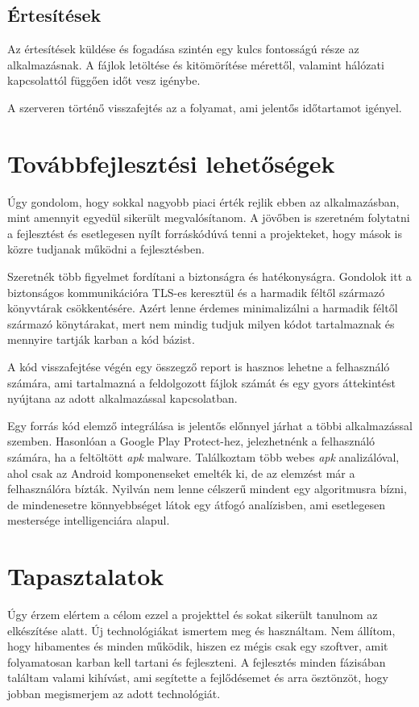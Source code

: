 \documentclass{thesis-ekf}
\theoremstyle{definition}
\theoremstyle{remark}
\begin{document}
\section{Értesítések}

Az értesítések küldése és fogadása szintén egy kulcs fontosságú része az alkalmazásnak.
A fájlok letöltése és kitömörítése mérettől, valamint hálózati kapcsolattól függően időt vesz igénybe.

A szerveren történő visszafejtés az a folyamat, ami jelentős időtartamot igényel.

\chapter{Továbbfejlesztési lehetőségek}\label{lehetosegek}

Úgy gondolom, hogy sokkal nagyobb piaci érték rejlik ebben az alkalmazásban, mint amennyit egyedül sikerült megvalósítanom.
A jövőben is szeretném folytatni a fejlesztést és esetlegesen nyílt forráskódúvá tenni a projekteket, hogy mások is közre tudjanak működni a fejlesztésben.

Szeretnék több figyelmet fordítani a biztonságra és hatékonyságra. 
Gondolok itt a biztonságos kommunikációra TLS-es keresztül és a harmadik féltől származó könyvtárak csökkentésére.
Azért lenne érdemes minimalizálni a harmadik féltől származó könytárakat, mert nem mindig tudjuk milyen kódot tartalmaznak és mennyire tartják karban a kód bázist.

A kód visszafejtése végén egy összegző report is hasznos lehetne a felhasználó számára, ami tartalmazná a feldolgozott fájlok számát és egy gyors áttekintést nyújtana az adott alkalmazással kapcsolatban.

Egy forrás kód elemző integrálása is jelentős előnnyel járhat a többi alkalmazással szemben. Hasonlóan a Google Play Protect-hez, jelezhetnénk a felhasználó számára, ha a feltöltött \emph{apk} malware.
Találkoztam több webes \emph{apk} analizálóval, ahol csak az Android komponenseket emelték ki, de az elemzést már a felhasználóra bízták.
Nyilván nem lenne célszerű mindent egy algoritmusra bízni, de mindenesetre könnyebbséget látok egy átfogó analízisben, ami esetlegesen mestersége intelligenciára alapul.

\chapter{Tapasztalatok}\label{tapasztalatok}

Úgy érzem elértem a célom ezzel a projekttel és sokat sikerült tanulnom az elkészítése alatt.
Új technológiákat ismertem meg és használtam. Nem állítom, hogy hibamentes és minden működik, hiszen ez mégis csak egy szoftver, amit folyamatosan karban kell tartani és fejleszteni.
A fejlesztés minden fázisában találtam valami kihívást, ami segítette a fejlődésemet és arra ösztönzöt, hogy jobban megismerjem az adott technológiát.
\end{document}
